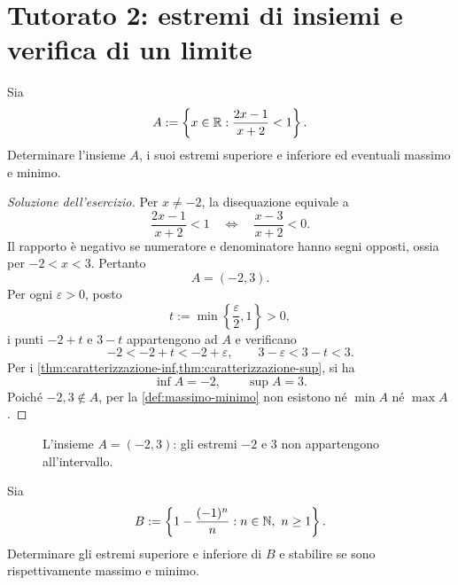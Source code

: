 \section[Tutorato 2 --- 22 ottobre 2026]{Tutorato 2: estremi di insiemi e verifica di un limite}
\label{chap:tutorato-02}

\begin{exercise}
\label{ex:disequazione-razionale}
Sia
\[
  A:=\left\{x\in\mathbb{R}:\frac{2x-1}{x+2}<1\right\}.
\]
Determinare l'insieme \(A\), i suoi estremi superiore e inferiore
ed eventuali massimo e minimo.
\end{exercise}

\begin{proof}[Soluzione dell'esercizio]
Per \(x\neq-2\), la disequazione equivale a
\[
  \frac{2x-1}{x+2}<1
  \quad\Longleftrightarrow\quad
  \frac{x-3}{x+2}<0.
\]
Il rapporto è negativo se numeratore e denominatore hanno segni
opposti, ossia per \(-2<x<3\). Pertanto
\[
  A=(-2,3).
\]
Per ogni \(\varepsilon>0\), posto
\[
  t:=\min\left\{\frac{\varepsilon}{2},1\right\}>0,
\]
i punti \(-2+t\) e \(3-t\) appartengono ad \(A\) e verificano
\[
  -2<-2+t<-2+\varepsilon,
  \qquad
  3-\varepsilon<3-t<3.
\]
Per i \cref{thm:caratterizzazione-inf,thm:caratterizzazione-sup},
si ha
\[
  \inf A=-2,\qquad \sup A=3.
\]
Poiché \(-2,3\notin A\), per la \cref{def:massimo-minimo}
non esistono né \(\min A\) né \(\max A\).
\end{proof}

\begin{figure}[htbp]
  \centering
  
  \caption{L'insieme \(A=(-2,3)\): gli estremi \(-2\) e \(3\)
  non appartengono all'intervallo.}
  \label{fig:intervallo-aperto}
\end{figure}

\begin{exercise}
\label{ex:estremi-termini}
Sia
\[
  B:=\left\{1-\frac{(-1)^n}{n}:n\in\N,\ n\ge1\right\}.
\]
Determinare gli estremi superiore e inferiore di \(B\) e
stabilire se sono rispettivamente massimo e minimo.
\end{exercise}

